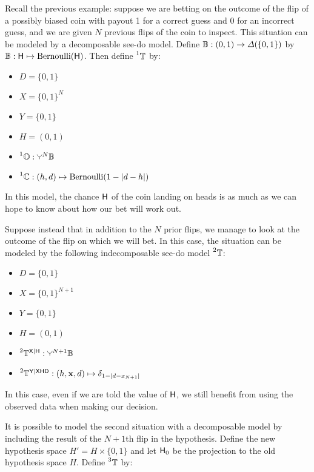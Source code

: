 Recall the previous example: suppose we are betting on the outcome of the flip of a possibly biased coin with payout 1 for a correct guess and 0 for an incorrect guess, and we are given $N$ previous flips of the coin to inspect. This situation can be modeled by a decomposable see-do model. Define $\mathbb{B}:(0,1)\to \Delta(\{0,1\})$ by $\mathbb{B}:\mathsf{H}\mapsto \mathrm{Bernoulli}(\mathsf{H})$. Then define $\prescript{1}{}{\ensuremath{\mathbb{T}}}$ by:

\begin{itemize}
    \item $D=\{0,1\}$
    \item $X=\{0,1\}^N$
    \item $Y=\{0,1\}$
    \item $H=(0,1)$
    \item $\prescript{1}{}{\kernel{O}}:\splitter{0.1}^N\kernel{B}$
    \item $\prescript{1}{}{\ensuremath{\mathbb{C}}}:(h,d)\mapsto \mathrm{Bernoulli}(1-|d-h|)$
\end{itemize}

In this model, the chance $\mathsf{H}$ of the coin landing on heads is as much as we can hope to know about how our bet will work out.

Suppose instead that in addition to the $N$ prior flips, we manage to look at the outcome of the flip on which we will bet. In this case, the situation can be modeled by the following indecomposable see-do model $\prescript{2}{}{\ensuremath{\mathbb{T}}}$:

\begin{itemize}
    \item $D=\{0,1\}$
    \item $X=\{0,1\}^{N+1}$
    \item $Y=\{0,1\}$
    \item $H=(0,1)$
    \item $\prescript{2}{}{\kernel{T}}^{\RV{X}|\RV{H}}:\splitter{0.1}^{N+1}\kernel{B}$
    \item $\prescript{2}{}{\ensuremath{\mathbb{T}}}^{\mathsf{Y}|\mathsf{X}\mathsf{H}\mathsf{D}}:(h,\mathbf{x},d)\mapsto \delta_{1-|d-x_{N+1}|}$
\end{itemize}

In this case, even if we are told the value of $\mathsf{H}$, we still benefit from using the observed data when making our decision.

It is possible to model the second situation with a decomposable model by including the result of the $N+1$th flip in the hypothesis. Define the new hypothesis space $H'=H\times\{0,1\}$ and let $\mathsf{H}_0$ be the projection to the old hypothesis space $H$. Define $\prescript{3}{}{\ensuremath{\mathbb{T}}}$ by:

